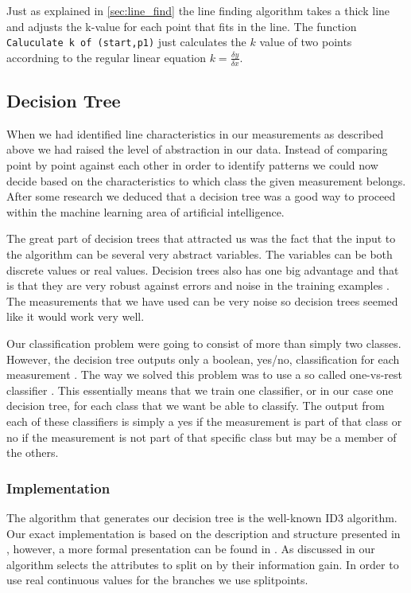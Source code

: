\documentclass[a4paper, 10pt, conference]{ieeeconf}      %
\begin{document}
Just as explained in \ref{sec:line_find} the line finding algorithm takes a thick line and adjusts the k-value for each point that fits in the line. The function \texttt{Caluculate k of (start,p1)} just calculates the $k$ value of two points accordning to the regular linear equation $k = \frac{\delta y}{\delta x}$.

\subsection{Decision Tree}
When we had identified line characteristics in our measurements as described above we had raised the level of abstraction in our data. Instead of comparing point by point against each other in order to identify patterns we could now decide based on the characteristics to which class the given measurement belongs. After some research we deduced that a decision tree was a good way to proceed within the machine learning area of artificial intelligence.

The great part of decision trees that attracted us was the fact that the input to the algorithm can be several very abstract variables. The variables can be both discrete values or real values. Decision trees also has one big advantage and that is that they are very robust against errors and noise in the training examples \cite{ml3}. The measurements that we have used can be very noise so decision trees seemed like it would work very well.

Our classification problem were going to consist of more than simply two classes. However, the decision tree outputs only a boolean, yes/no, classification for each measurement \cite{ml3}. The way we solved this problem was to use a so called one-vs-rest classifier \cite{praml}. This essentially means that we train one classifier, or in our case one decision tree, for each class that we want be able to classify. The output from each of these classifiers is simply a yes if the measurement is part of that class or no if the measurement is not part of that specific class but may be a member of the others.

\subsubsection{Implementation}
The algorithm that generates our decision tree is the well-known ID3 algorithm. Our exact implementation is based on the description and structure presented in \cite{aima}, however, a more formal presentation can be found in \cite{ml3}. As discussed in \cite{aima} our algorithm selects the attributes to split on by their information gain. In order to use real continuous values for the branches we use splitpoints.
\end{document}
